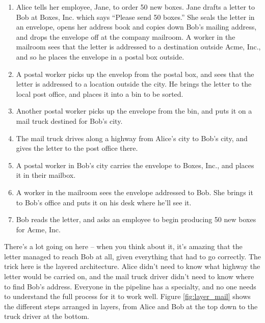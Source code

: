 \begin{enumerate}
    \item Alice tells her employee, Jane, to order 50 new boxes. Jane drafts a letter to Bob at Boxes, Inc. which says ``Please send 50 boxes.'' She seals the letter in an envelope, opens her address book and copies down Bob's mailing address, and drops the envelope off at the company mailroom. A worker in the mailroom sees that the letter is addressed to a destination outside Acme, Inc., and so he places the envelope in a postal box outside.
    \item A postal worker picks up the envelop from the postal box, and sees that the letter is addressed to a location outside the city. He brings the letter to the local post office, and places it into a bin to be sorted.
    \item Another postal worker picks up the envelope from the bin, and puts it on a mail truck destined for Bob's city.
    \item The mail truck drives along a highway from Alice's city to Bob's city, and gives the letter to the post office there.
    \item A postal worker in Bob's city carries the envelope to Boxes, Inc., and places it in their mailbox.
    \item A worker in the mailroom sees the envelope addressed to Bob. She brings it to Bob's office and puts it on his desk where he'll see it.
    \item Bob reads the letter, and asks an employee to begin producing 50 new boxes for Acme, Inc.
\end{enumerate}

There's a lot going on here -- when you think about it, it's amazing that the letter managed to reach Bob at all, given everything that had to go correctly. The trick here is the layered architecture. Alice didn't need to know what highway the letter would be carried on, and the mail truck driver didn't need to know where to find Bob's address. Everyone in the pipeline has a specialty, and no one needs to understand the full process for it to work well. Figure \ref{fig:layer_mail} shows the different steps arranged in layers, from Alice and Bob at the top down to the truck driver at the bottom.

